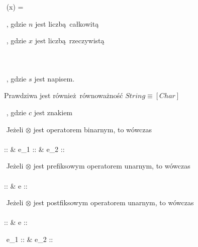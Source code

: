 \documentclass[12pt]{article}
\begin{document}
$ $\newline
{}
      {\Gamma(x) = \tau}  


$ $\newline
{}
      {}
,\,\,gdzie $n$ jest liczbą całkowitą


$ $\newline
{}
    {}  
    ,\,\,gdzie $x$ jest liczbą rzeczywistą

$ $\newline
{}
      {}

$ $\newline
{}
      {}

$ $\newline
{}
    {}

$ $\newline
{}
      {}
,\,\,gdzie $s$ jest napisem.

Prawdziwa jest również równoważność $String \equiv [Char]$

$ $\newline
{}
      {}
,\,\,gdzie $c$ jest znakiem

$ $\newline
Jeżeli $\otimes$ jest operatorem binarnym, to wówczas\\\\
      {\Gamma \vdash \otimes :: \alpha \shortrightarrow \beta \shortrightarrow \tau 
      & \Gamma \vdash e_1 :: \alpha & \Gamma \vdash e_2 :: \beta}

$ $\newline
Jeżeli $\otimes$ jest prefiksowym operatorem unarnym, to wówczas\\\\
      {\Gamma \vdash \otimes :: \alpha \shortrightarrow \tau 
      & \Gamma \vdash e :: \alpha}

$ $\newline
Jeżeli $\otimes$ jest postfiksowym operatorem unarnym, to wówczas\\\\
    {\Gamma \vdash \otimes :: \alpha \shortrightarrow \tau 
    & \Gamma \vdash e :: \alpha}

$ $\newline
{}
      {\Gamma \vdash e_1 :: \alpha
      &  \vdash e_2 :: \tau}
\end{document}
